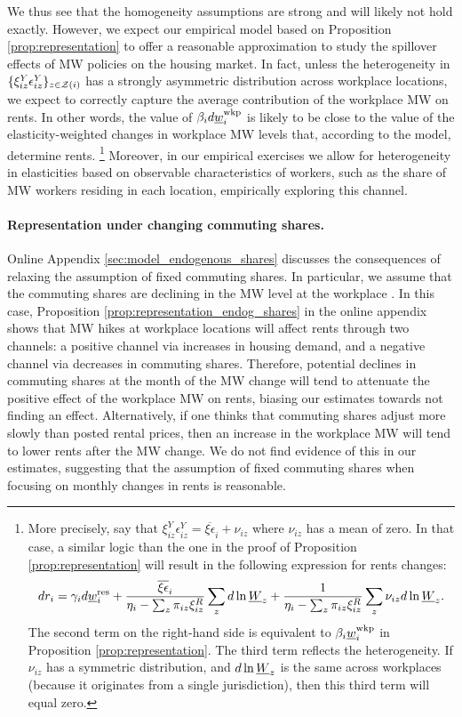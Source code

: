 We thus see that the homogeneity assumptions are strong and will likely not hold 
exactly.
However, we expect our empirical model based on Proposition 
\ref{prop:representation} to offer a reasonable approximation to study the 
spillover effects of MW policies on the housing market.
In fact, unless the heterogeneity in $\{\xi_{iz}^Y\epsilon_{iz}^Y\}_{z\in\mathcal{Z}(i)}$ 
has a strongly asymmetric distribution across workplace locations, we expect to 
correctly capture the average contribution of the workplace MW on rents.
In other words, the value of $\beta_i  d \underline{w}^{\text{wkp}}_i$ is likely to be close 
to the value of the elasticity-weighted changes in workplace MW levels that, 
according to the model, determine rents.%
\footnote{More precisely, say that 
    $\xi^Y_{iz}\epsilon_{iz}^Y = \overline{\xi\epsilon}_i + \nu_{iz}$ where 
    $\nu_{iz}$ has a mean of zero.
    In that case, a similar logic than the one in the proof of Proposition 
    \ref{prop:representation} will result in the following expression for 
    rents changes:
    $$
        d r_i = \gamma_i d \underline{w}^{\text{res}}_i
            + \frac{\overline{\xi\epsilon}_i}
                    {\eta_{i} - \sum_z \pi_{iz} \xi_{iz}^R} \sum_z d\ln \underline{W}_z
            + \frac{1}
                    {\eta_{i} - \sum_z \pi_{iz} \xi_{iz}^R} \sum_z \nu_{iz} d\ln \underline{W}_z .
    $$
    The second term on the right-hand side is equivalent to $\beta_i \underline{w}_{i}^{\text{wkp}}$
    in Proposition \ref{prop:representation}.
    The third term reflects the heterogeneity.
    If $\nu_{iz}$ has a symmetric distribution, and $d\ln \underline{W}_z$ is the same across 
    workplaces (because it originates from a single jurisdiction), then this third 
    term will equal zero.}
Moreover, in our empirical exercises we allow for heterogeneity in elasticities
based on observable characteristics of workers, 
such as the share of MW workers residing in each location, empirically 
exploring this channel.

\paragraph{Representation under changing commuting shares.} 

Online Appendix \ref{sec:model_endogenous_shares} discusses the consequences
of relaxing the assumption of fixed commuting shares.
In particular, we assume that the commuting shares are declining in the MW level
at the workplace \parencite[as found by, e.g.,][]{PerezPerez2021}.
In this case, Proposition \ref{prop:representation_endog_shares} in the online
appendix shows that MW hikes at workplace locations will affect rents through 
two channels:
a positive channel via increases in housing demand, and
a negative channel via decreases in commuting shares.
Therefore, potential declines in commuting shares at the month of the MW change 
will tend to attenuate the positive effect of the workplace MW on rents, biasing 
our estimates towards not finding an effect.
Alternatively, if one thinks that commuting shares adjust more slowly than
posted rental prices, then an increase in the workplace MW will tend to
lower rents after the MW change.
We do not find evidence of this in our estimates, suggesting that the assumption
of fixed commuting shares when focusing on monthly changes in rents is
reasonable.
